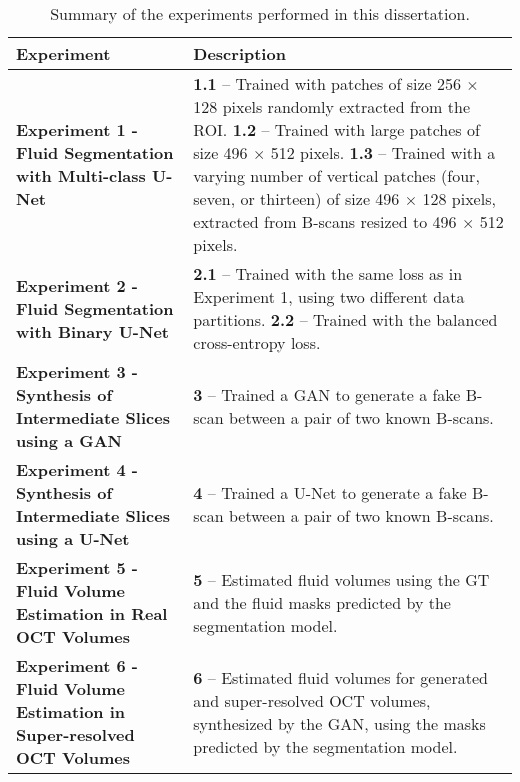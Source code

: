 \begin{table}[H]
	\centering
	\caption{Summary of the experiments performed in this dissertation.}
	\begin{tabular}{|p{7cm}|p{7cm}|}
		\hline
		\textbf{Experiment} & \textbf{Description} \\
		\hline
		\textbf{Experiment 1 - Fluid Segmentation with Multi-class U-Net} &
		\textbf{1.1} – Trained with patches of size 256 $\times$ 128 pixels randomly extracted from the ROI. \newline
		\textbf{1.2} – Trained with large patches of size 496 $\times$ 512 pixels. \newline
		\textbf{1.3} – Trained with a varying number of vertical patches (four, seven, or thirteen) of size 496 $\times$ 128 pixels, extracted from B-scans resized to 496 $\times$ 512 pixels. \\
		\hline
		\textbf{Experiment 2 - Fluid Segmentation with Binary U-Net} & \textbf{2.1} – Trained with the same loss as in Experiment 1, using two different data partitions. \newline
		\textbf{2.2} – Trained with the balanced cross-entropy loss. \\
		\hline
		\textbf{Experiment 3 - Synthesis of Intermediate Slices using a GAN} &
		\textbf{3} – Trained a GAN to generate a fake B-scan between a pair of two known B-scans. \\
		\hline
		\textbf{Experiment 4 - Synthesis of Intermediate Slices using a U-Net} &
		\textbf{4} – Trained a U-Net to generate a fake B-scan between a pair of two known B-scans. \\
		\hline
		\textbf{Experiment 5 - Fluid Volume Estimation in Real OCT Volumes} &
		\textbf{5} – Estimated fluid volumes using the GT and the fluid masks predicted by the segmentation model. \\
		\hline
		\textbf{Experiment 6 - Fluid Volume Estimation in Super-resolved OCT Volumes} &
		\textbf{6} – Estimated fluid volumes for generated and super-resolved OCT volumes, synthesized by the GAN, using the masks predicted by the segmentation model. \\
		\hline
	\end{tabular}
	\label{tab:ExperimentsSummary}
\end{table}
